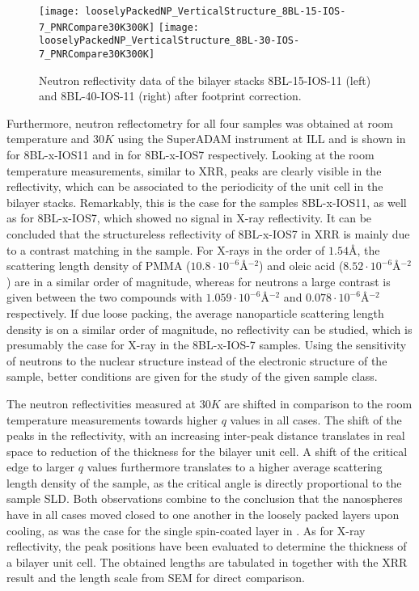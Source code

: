 \documentclass[\main/dresen_thesis.tex]{subfiles}
\begin{document}
  \begin{figure}[tb]
    \centering
    \texttt{[image: looselyPackedNP\_VerticalStructure\_8BL-15-IOS-7\_PNRCompare30K300K]}
    \texttt{[image: looselyPackedNP\_VerticalStructure\_8BL-30-IOS-7\_PNRCompare30K300K]}
    \caption{\label{fig:looselyPackedNS:bilayerStacks:nr300K8BLIOS7}Neutron reflectivity data of the bilayer stacks 8BL-15-IOS-11 (left) and 8BL-40-IOS-11 (right) after footprint correction.}
  \end{figure}

  Furthermore, neutron reflectometry for all four samples was obtained at room temperature and $30 \unit{K}$ using the SuperADAM instrument at ILL and is shown in  for 8BL-x-IOS11 and in  for 8BL-x-IOS7 respectively.
  Looking at the room temperature measurements, similar to XRR, peaks are clearly visible in the reflectivity, which can be associated to the periodicity of the unit cell in the bilayer stacks.
  Remarkably, this is the case for the samples 8BL-x-IOS11, as well as for 8BL-x-IOS7, which showed no signal in X-ray reflectivity.
  It can be concluded that the structureless reflectivity of 8BL-x-IOS7 in XRR is mainly due to a contrast matching in the sample.
  For X-rays in the order of $1.54 \unit{\angstrom}$, the scattering length density of PMMA ($10.8 \cdot \unit{10^{-6} \angstrom^{-2}}$) and oleic acid ($8.52 \cdot \unit{10^{-6} \angstrom^{-2}}$) are in a similar order of magnitude, whereas for neutrons a large contrast is given between the two compounds with $1.059 \cdot \unit{10^{-6} \angstrom^{-2}}$ and $0.078 \cdot \unit{10^{-6} \angstrom^{-2}}$ respectively.
  If due loose packing, the average nanoparticle scattering length density is on a similar order of magnitude, no reflectivity can be studied, which is presumably the case for X-ray in the 8BL-x-IOS-7 samples.
  Using the sensitivity of neutrons to the nuclear structure instead of the electronic structure of the sample, better conditions are given for the study of the given sample class.

  The neutron reflectivities measured at $30 \unit{K}$ are shifted in comparison to the room temperature measurements towards higher $q$ values in all cases.
  The shift of the peaks in the reflectivity, with an increasing inter-peak distance translates in real space to reduction of the thickness for the bilayer unit cell.
  A shift of the critical edge to larger $q$ values furthermore translates to a higher average scattering length density of the sample, as the critical angle is directly proportional to the sample SLD.
  Both observations combine to the conclusion that the nanospheres have in all cases moved closed to one another in the loosely packed layers upon cooling, as was the case for the single spin-coated layer in .
  As for X-ray reflectivity, the peak positions have been evaluated to determine the thickness of a bilayer unit cell.
  The obtained lengths are tabulated in  together with the XRR result and the length scale from SEM for direct comparison.
\end{document}
